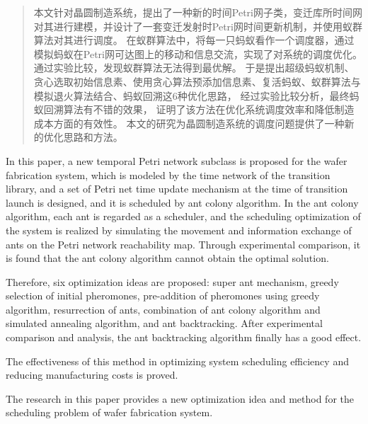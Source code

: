 \begin{abstract}
    本文针对晶圆制造系统，提出了一种新的时间Petri网子类，变迁库所时间网对其进行建模，并设计了一套变迁发射时Petri网时间更新机制，并使用蚁群算法对其进行调度。
    在蚁群算法中，将每一只蚂蚁看作一个调度器，通过模拟蚂蚁在Petri网可达图上的移动和信息交流，实现了对系统的调度优化。
    通过实验比较，发现蚁群算法无法得到最优解。
    于是提出超级蚂蚁机制、贪心选取初始信息素、使用贪心算法预添加信息素、复活蚂蚁、蚁群算法与模拟退火算法结合、蚂蚁回溯这6种优化思路，
    经过实验比较分析，最终蚂蚁回溯算法有不错的效果，
    证明了该方法在优化系统调度效率和降低制造成本方面的有效性。
    本文的研究为晶圆制造系统的调度问题提供了一种新的优化思路和方法。

\end{abstract}
\begin{englishabstract}
    In this paper, a new temporal Petri network subclass is proposed for the wafer fabrication system, which is modeled by the time network of the transition library, and a set of Petri net time update mechanism at the time of transition launch is designed, and it is scheduled by ant colony algorithm.
    In the ant colony algorithm, each ant is regarded as a scheduler, and the scheduling optimization of the system is realized by simulating the movement and information exchange of ants on the Petri network reachability map.
    Through experimental comparison, it is found that the ant colony algorithm cannot obtain the optimal solution.

    Therefore, six optimization ideas are proposed: super ant mechanism, greedy selection of initial pheromones, pre-addition of pheromones using greedy algorithm, resurrection of ants, combination of ant colony algorithm and simulated annealing algorithm, and ant backtracking.
    After experimental comparison and analysis, the ant backtracking algorithm finally has a good effect.

    The effectiveness of this method in optimizing system scheduling efficiency and reducing manufacturing costs is proved.

    The research in this paper provides a new optimization idea and method for the scheduling problem of wafer fabrication system.
    
\end{englishabstract}
\XDUpremainmatter
